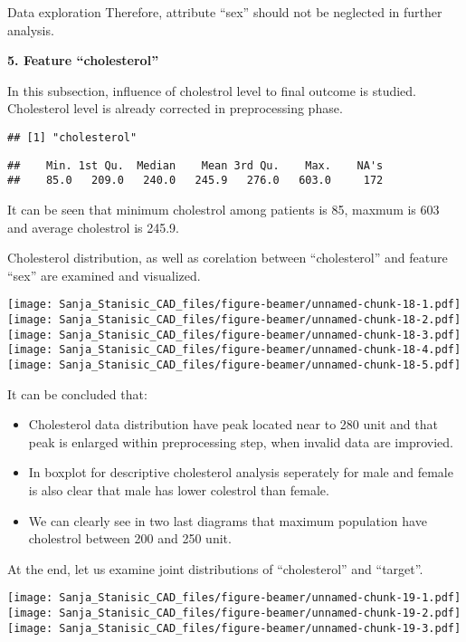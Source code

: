\documentclass[
  ignorenonframetext,
]{beamer}
\begin{document}
\begin{frame}[fragile]{Data exploration}
Therefore, attribute ``sex'' should not be neglected in further
analysis.

\textbf{5. Feature ``cholesterol''}

In this subsection, influence of cholestrol level to final outcome is
studied. Cholesterol level is already corrected in preprocessing phase.

\begin{verbatim}
## [1] "cholesterol"
\end{verbatim}

\begin{verbatim}
##    Min. 1st Qu.  Median    Mean 3rd Qu.    Max.    NA's 
##    85.0   209.0   240.0   245.9   276.0   603.0     172
\end{verbatim}

It can be seen that minimum cholestrol among patients is 85, maxmum is
603 and average cholestrol is 245.9.

Cholesterol distribution, as well as corelation between ``cholesterol''
and feature ``sex'' are examined and visualized.

\texttt{[image: Sanja\_Stanisic\_CAD\_files/figure-beamer/unnamed-chunk-18-1.pdf]}
\texttt{[image: Sanja\_Stanisic\_CAD\_files/figure-beamer/unnamed-chunk-18-2.pdf]}
\texttt{[image: Sanja\_Stanisic\_CAD\_files/figure-beamer/unnamed-chunk-18-3.pdf]}
\texttt{[image: Sanja\_Stanisic\_CAD\_files/figure-beamer/unnamed-chunk-18-4.pdf]}
\texttt{[image: Sanja\_Stanisic\_CAD\_files/figure-beamer/unnamed-chunk-18-5.pdf]}

It can be concluded that:

\begin{itemize}
\item
  Cholesterol data distribution have peak located near to 280 unit and
  that peak is enlarged within preprocessing step, when invalid data are
  improvied.
\item
  In boxplot for descriptive cholesterol analysis seperately for male
  and female is also clear that male has lower colestrol than female.
\item
  We can clearly see in two last diagrams that maximum population have
  cholestrol between 200 and 250 unit.
\end{itemize}

At the end, let us examine joint distributions of ``cholesterol'' and
``target''.

\texttt{[image: Sanja\_Stanisic\_CAD\_files/figure-beamer/unnamed-chunk-19-1.pdf]}
\texttt{[image: Sanja\_Stanisic\_CAD\_files/figure-beamer/unnamed-chunk-19-2.pdf]}
\texttt{[image: Sanja\_Stanisic\_CAD\_files/figure-beamer/unnamed-chunk-19-3.pdf]}


\end{frame}
\end{document}
